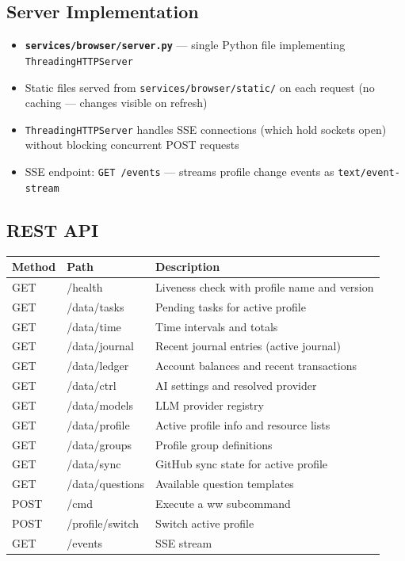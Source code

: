 \documentclass[
]{article}
\newcounter{none} %
\providecommand{\tightlist}{%
  \setlength{\itemsep}{0pt}\setlength{\parskip}{0pt}}
\begin{document}
\subsection{Server Implementation}\label{server-implementation}

\begin{itemize}
\tightlist
\item
  \textbf{\texttt{services/browser/server.py}} --- single Python file
  implementing \texttt{ThreadingHTTPServer}
\item
  Static files served from \texttt{services/browser/static/} on each
  request (no caching --- changes visible on refresh)
\item
  \texttt{ThreadingHTTPServer} handles SSE connections (which hold
  sockets open) without blocking concurrent POST requests
\item
  SSE endpoint: \texttt{GET\ /events} --- streams profile change events
  as \texttt{text/event-stream}
\end{itemize}

\subsection{REST API}\label{rest-api}

{\def\LTcaptype{none} %
\begin{longtable}[]{@{}lll@{}}
\toprule\noalign{}
Method & Path & Description \\
\midrule\noalign{}
\endhead
\bottomrule\noalign{}
\endlastfoot
GET & /health & Liveness check with profile name and version \\
GET & /data/tasks & Pending tasks for active profile \\
GET & /data/time & Time intervals and totals \\
GET & /data/journal & Recent journal entries (active journal) \\
GET & /data/ledger & Account balances and recent transactions \\
GET & /data/ctrl & AI settings and resolved provider \\
GET & /data/models & LLM provider registry \\
GET & /data/profile & Active profile info and resource lists \\
GET & /data/groups & Profile group definitions \\
GET & /data/sync & GitHub sync state for active profile \\
GET & /data/questions & Available question templates \\
POST & /cmd & Execute a ww subcommand \\
POST & /profile/switch & Switch active profile \\
GET & /events & SSE stream \\
\end{longtable}
}
\end{document}
